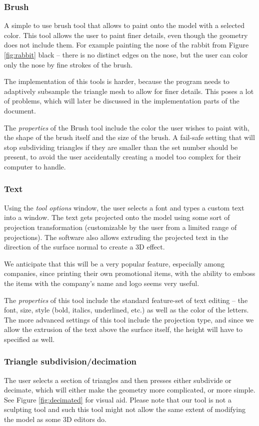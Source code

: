\subsubsection{Brush}
A simple to use brush tool that allows to paint onto the model with a selected color. This tool allows the user to paint finer details, even though the geometry does not include them. For example painting the nose of the rabbit from Figure \ref{fig:rabbit} black -- there is no distinct edges on the nose, but the user can color only the nose by fine strokes of the brush.

The implementation of this tools is harder, because the program needs to adaptively subsample the triangle mesh to allow for finer details. This poses a lot of problems, which will later be discussed in the implementation parts of the document.

The \textit{properties} of the Brush tool include the color the user wishes to paint with, the shape of the brush itself and the size of the brush. A fail-safe setting that will stop subdividing triangles if they are smaller than the set number should be present, to avoid the user accidentally creating a model too complex for their computer to handle.

\subsubsection{Text}
Using the \textit{tool options} window, the user selects a font and types a custom text into a window. The text gets projected onto the model using some sort of projection transformation (customizable by the user from a limited range of projections). The software also allows extruding the projected text in the direction of the surface normal to create a $3$D effect.

We anticipate that this will be a very popular feature, especially among companies, since printing their own promotional items, with the ability to emboss the items with the company's name and logo seems very useful. 

The \textit{properties} of this tool include the standard feature-set of text editing -- the font, size, style (bold, italics, underlined, etc.) as well as the color of the letters. The more advanced settings of this tool include the projection type, and since we allow the extrusion of the text above the surface itself, the height will have to specified as well.

\subsubsection{Triangle subdivision/decimation}
The user selects a section of triangles and then presses either subdivide or decimate, which will either make the geometry more complicated, or more simple. See Figure \ref{fig:decimated} for visual aid. Please note that our tool is not a sculpting tool and such this tool might not allow the same extent of modifying the model as some 3D editors do.

